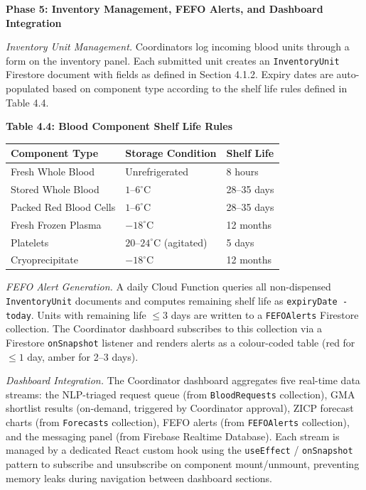 \documentclass[12pt,a4paper]{article}
\begin{document}
\vspace{1.2em}
\noindent\textbf{Phase 5: Inventory Management, FEFO Alerts, and Dashboard Integration}
\vspace{0.5em}

\noindent\textit{Inventory Unit Management.} Coordinators log incoming blood units through a form on the inventory panel. Each submitted unit creates an \texttt{InventoryUnit} Firestore document with fields as defined in Section 4.1.2. Expiry dates are auto-populated based on component type according to the shelf life rules defined in Table 4.4.

\begin{center}
\textbf{Table 4.4: Blood Component Shelf Life Rules}
\vspace{0.4em}
\begin{tabular}{lll}
\toprule
\textbf{Component Type} & \textbf{Storage Condition} & \textbf{Shelf Life} \\
\midrule
Fresh Whole Blood & Unrefrigerated & 8 hours \\
Stored Whole Blood & $1$--$6^\circ$C & 28--35 days \\
Packed Red Blood Cells & $1$--$6^\circ$C & 28--35 days \\
Fresh Frozen Plasma & $-18^\circ$C & 12 months \\
Platelets & $20$--$24^\circ$C (agitated) & 5 days \\
Cryoprecipitate & $-18^\circ$C & 12 months \\
\bottomrule
\end{tabular}
\end{center}

\noindent\textit{FEFO Alert Generation.} A daily Cloud Function queries all non-dispensed \texttt{InventoryUnit} documents and computes remaining shelf life as \texttt{expiryDate - today}. Units with remaining life $\leq 3$ days are written to a \texttt{FEFOAlerts} Firestore collection. The Coordinator dashboard subscribes to this collection via a Firestore \texttt{onSnapshot} listener and renders alerts as a colour-coded table (red for $\leq 1$ day, amber for 2--3 days).

\noindent\textit{Dashboard Integration.} The Coordinator dashboard aggregates five real-time data streams: the NLP-triaged request queue (from \texttt{BloodRequests} collection), GMA shortlist results (on-demand, triggered by Coordinator approval), ZICP forecast charts (from \texttt{Forecasts} collection), FEFO alerts (from \texttt{FEFOAlerts} collection), and the messaging panel (from Firebase Realtime Database). Each stream is managed by a dedicated React custom hook using the \texttt{useEffect} / \texttt{onSnapshot} pattern to subscribe and unsubscribe on component mount/unmount, preventing memory leaks during navigation between dashboard sections.
\end{document}
